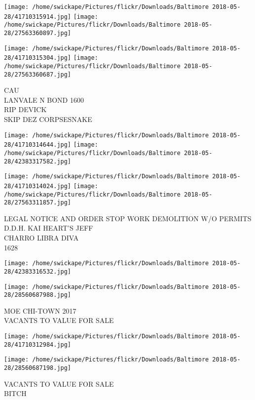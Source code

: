 \documentclass[10pt,letterpaper]{article}
\begin{document}
\texttt{[image: /home/swickape/Pictures/flickr/Downloads/Baltimore 2018-05-28/41710315914.jpg]}
\texttt{[image: /home/swickape/Pictures/flickr/Downloads/Baltimore 2018-05-28/27563360897.jpg]}

\texttt{[image: /home/swickape/Pictures/flickr/Downloads/Baltimore 2018-05-28/41710315304.jpg]}
\texttt{[image: /home/swickape/Pictures/flickr/Downloads/Baltimore 2018-05-28/27563360687.jpg]}

CAU\\
LANVALE N BOND 1600\\
RIP DEVICK\\
SKIP DEZ CORPSESNAKE\\
\pagebreak

\texttt{[image: /home/swickape/Pictures/flickr/Downloads/Baltimore 2018-05-28/41710314644.jpg]}
\texttt{[image: /home/swickape/Pictures/flickr/Downloads/Baltimore 2018-05-28/42383317582.jpg]}

\texttt{[image: /home/swickape/Pictures/flickr/Downloads/Baltimore 2018-05-28/41710314024.jpg]}
\texttt{[image: /home/swickape/Pictures/flickr/Downloads/Baltimore 2018-05-28/27563311857.jpg]}

LEGAL NOTICE AND ORDER STOP WORK DEMOLITION W/O PERMITS\\
D.D.H. KAI HEART'S JEFF\\
CHARRO LIBRA DIVA\\
1628\\
\pagebreak

\texttt{[image: /home/swickape/Pictures/flickr/Downloads/Baltimore 2018-05-28/42383316532.jpg]}

\vspace{0.25in}
\texttt{[image: /home/swickape/Pictures/flickr/Downloads/Baltimore 2018-05-28/28560687988.jpg]}

MOE CHI{-}TOWN 2017\\
VACANTS TO VALUE FOR SALE\\
\pagebreak

\texttt{[image: /home/swickape/Pictures/flickr/Downloads/Baltimore 2018-05-28/41710312984.jpg]}

\vspace{0.25in}
\texttt{[image: /home/swickape/Pictures/flickr/Downloads/Baltimore 2018-05-28/28560687198.jpg]}

VACANTS TO VALUE FOR SALE\\
BITCH\\
\pagebreak
\end{document}
